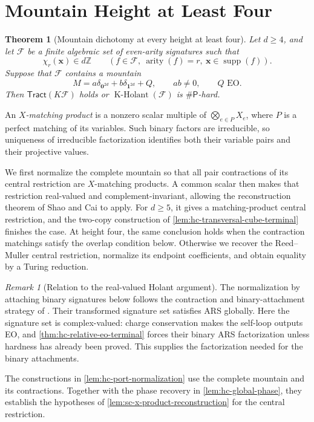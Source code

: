 \documentclass[11pt,letterpaper,onecolumn]{article}
\theoremstyle{plain}
\newtheorem{theorem}{Theorem}[section]
\theoremstyle{definition}
\theoremstyle{remark}
\newtheorem{remark}[remark]{Remark}
\newcommand{\cF}{\mathcal F}
\newcommand{\KHolant}{\operatorname{K\text{-}Holant}}
\newcommand{\Tract}{\mathsf{Tract}}
\newcommand{\SharpP}{\#\mathsf P}
\newcommand{\supp}{\operatorname{supp}}
\newcommand{\arity}{\operatorname{arity}}
\newcommand{\one}{\mathbf 1}
\newcommand{\zero}{\mathbf 0}
\begin{document}
	\section{Mountain Height at Least Four}
	\label{sec:height-at-least-four}
	
	\begin{theorem}[Mountain dichotomy at every height at least four]
		\label{thm:height-at-least-four}
		Let \(d\ge4\), and let \(\cF\) be a finite algebraic set of even-arity
		signatures such that
		\[
		\chi_r({\mathbf x})\in d\mathbb Z
		\qquad(f\in\cF,\ \arity(f)=r,\ {\mathbf x}\in\supp(f)).
		\]
		Suppose that \(\cF\) contains a mountain
		\[
		M=a\delta_{\zero^{2d}}+b\delta_{\one^{2d}}+Q,
		\qquad ab\ne0,\qquad Q\text{ EO}.
		\]
		Then \(\Tract(K\cF)\) holds or \(\KHolant(\cF)\) is
		\(\SharpP\)-hard.
	\end{theorem}
	
	An \emph{\(X\)-matching product} is a nonzero scalar multiple of
	\(\bigotimes_{e\in P}X_e\), where \(P\) is a perfect matching of its
	variables. Such binary factors are irreducible, so
	uniqueness of irreducible factorization identifies both their variable pairs
	and their projective values.
	
	We first normalize the complete mountain so that all pair contractions
	of its central restriction are \(X\)-matching products. A common scalar
	then makes that restriction real-valued and complement-invariant, allowing
	the reconstruction theorem of Shao and Cai to apply. For \(d\ge5\), it
	gives a matching-product central restriction, and the two-copy construction
	of \cref{lem:hc-transversal-cube-terminal} finishes the case.
	At height four, the same conclusion holds when the contraction matchings
	satisfy the overlap condition below. Otherwise we recover the Reed--Muller
	central restriction, normalize its endpoint coefficients, and obtain
	equality by a Turing reduction.
	
	\begin{remark}[Relation to the real-valued Holant argument]
		\label{rem:sc20-high-height}
		The normalization by attaching binary signatures below follows the contraction and binary-attachment
		strategy of \cite[full version, Lemma~8.1]{ShaoCai2020}.  Their transformed
		signature set satisfies ARS globally.  Here the signature set is
		complex-valued: charge conservation makes the self-loop outputs EO, and
		\cref{thm:hc-relative-eo-terminal} forces their binary ARS factorization
		unless hardness has already been proved.  This supplies the factorization needed for the binary attachments.
		
        The constructions in \cref{lem:hc-port-normalization} use the complete
        mountain and its contractions. Together with the phase recovery in
        \cref{lem:hc-global-phase}, they establish the hypotheses of
        \cref{lem:sc-x-product-reconstruction} for the central restriction.
	\end{remark}
	
\end{document}
